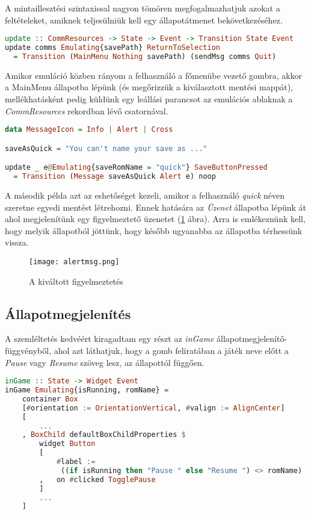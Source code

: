 A mintaillesztési szintaxissal nagyon tömören megfogalmazhatjuk azokat a feltételeket, amiknek teljesülniük kell egy állapotátmenet bekövetkezéséhez.
\vspace{0.2cm}
\begin{lstlisting}[language=Haskell, basicstyle=\scriptsize]
update :: CommResources -> State -> Event -> Transition State Event
update comms Emulating{savePath} ReturnToSelection 
  = Transition (MainMenu Nothing savePath) (sendMsg comms Quit)
\end{lstlisting}
\vspace{0.2cm}
Amikor emuláció közben rányom a felhasználó a főmenübe vezető gombra, akkor a MainMenu állapotba lépünk (és megőrizzük a kiválasztott mentési mappát), mellékhatásként pedig küldünk egy leállási parancsot az emulációs ablaknak a \emph{CommResources} rekordban lévő csatornával. 
\vspace{0.2cm}
\begin{lstlisting}[language=Haskell, basicstyle=\scriptsize]
data MessageIcon = Info | Alert | Cross

saveAsQuick = "You can't name your save as ..."

update _ e@Emulating{saveRomName = "quick"} SaveButtonPressed 
  = Transition (Message saveAsQuick Alert e) noop
\end{lstlisting}

A második példa azt az eshetőséget kezeli, amikor a felhasználó \emph{quick} néven szeretne egyedi mentést létrehozni. Ennek hatására az \emph{Üzenet} állapotba lépünk át ahol megjelenítünk egy figyelmeztető üzenetet (\ref{fig:warning} ábra). Arra is emlékeznünk kell, hogy melyik állapotból jöttünk, hogy később ugyanabba az állapotba térhessünk vissza. 

\begin{figure}[H]
	\centering
	\texttt{[image: alertmsg.png]}
	\caption{A kiváltott figyelmeztetés}
	\label{fig:warning}
\end{figure}

\subsection{Állapotmegjelenítés}

A szemléltetés kedvéért kiragadtam egy részt az \emph{inGame} állapotmegjelenítő-függvényből, ahol azt láthatjuk, hogy a gomb feliratában a játék neve előtt a \emph{Pause} vagy \emph{Resume} szöveg lesz, az állapottól függően.
\vspace{0.2cm}
\begin{lstlisting}[language=Haskell, basicstyle=\scriptsize]
inGame :: State -> Widget Event
inGame Emulating{isRunning, romName} = 
	container Box
	[#orientation := OrientationVertical, #valign := AlignCenter]
	[
		...
	, BoxChild defaultBoxChildProperties $ 
		widget Button
		[ 
			#label :=
			 ((if isRunning then "Pause " else "Resume ") <> romName)
		,	on #clicked TogglePause
		]
		...
	]
	
\end{lstlisting}

